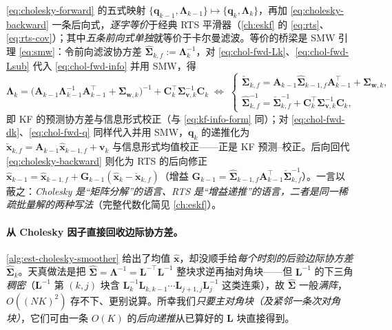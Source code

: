 \begin{insight}[前向 pass $=$ 卡尔曼滤波，前向 $+$ 后向 $=$ RTS 平滑]
\cref{eq:cholesky-forward} 的五式映射 $\{\mathbf{q}_{k-1},\boldsymbol{\Lambda}_{k-1}\}\mapsto\{\mathbf{q}_k,\boldsymbol{\Lambda}_k\}$，再加 \cref{eq:cholesky-backward} 一条后向式，\emph{逐字等价}于经典 RTS 平滑器（\cref{ch:eskf} 的 \cref{eq:rts}、\cref{eq:rts-cov}）；其中\emph{五条前向式单独}就等价于卡尔曼滤波。等价的桥梁是 SMW 引理 \cref{eq:smw}：令前向滤波协方差 $\hat{\boldsymbol{\Sigma}}_{k,f}:=\boldsymbol{\Lambda}_k^{-1}$，对 \cref{eq:chol-fwd-Lk}、\cref{eq:chol-fwd-Lsub} 代入 \cref{eq:chol-fwd-info} 并用 SMW，得
\[
  \boldsymbol{\Lambda}_k=\big(\mathbf{A}_{k-1}\boldsymbol{\Lambda}_{k-1}^{-1}\mathbf{A}_{k-1}^\top+\boldsymbol{\Sigma}_{\mathbf{w},k}\big)^{-1}+\mathbf{C}_k^\top\boldsymbol{\Sigma}_{\mathbf{v},k}^{-1}\mathbf{C}_k
  \;\Longleftrightarrow\;
  \begin{cases}\check{\boldsymbol{\Sigma}}_{k,f}=\mathbf{A}_{k-1}\hat{\boldsymbol{\Sigma}}_{k-1,f}\mathbf{A}_{k-1}^\top+\boldsymbol{\Sigma}_{\mathbf{w},k},\\ \hat{\boldsymbol{\Sigma}}_{k,f}^{-1}=\check{\boldsymbol{\Sigma}}_{k,f}^{-1}+\mathbf{C}_k^\top\boldsymbol{\Sigma}_{\mathbf{v},k}^{-1}\mathbf{C}_k,\end{cases}
\]
即 KF 的预测协方差与信息形式校正（与 \cref{eq:kf-info-form} 同）；对 \cref{eq:chol-fwd-dk}、\cref{eq:chol-fwd-q} 同样代入并用 SMW，$\mathbf{q}_k$ 的递推化为 $\check{\mathbf{x}}_{k,f}=\mathbf{A}_{k-1}\hat{\mathbf{x}}_{k-1,f}+\mathbf{v}_k$ 与信息形式均值校正——正是 KF 预测–校正。后向回代 \cref{eq:cholesky-backward} 则化为 RTS 的后向修正 $\hat{\mathbf{x}}_{k-1}=\hat{\mathbf{x}}_{k-1,f}+\mathbf{G}_{k-1}(\hat{\mathbf{x}}_k-\check{\mathbf{x}}_{k,f})$（增益 $\mathbf{G}_{k-1}=\hat{\boldsymbol{\Sigma}}_{k-1,f}\mathbf{A}_{k-1}^\top\check{\boldsymbol{\Sigma}}_{k,f}^{-1}$）。一言以蔽之：\emph{Cholesky 是“矩阵分解”的语言、RTS 是“增益递推”的语言，二者是同一稀疏批量解的两种写法}（完整代数化简见 \cref{ch:eskf}）。
\end{insight}

\paragraph{从 Cholesky 因子直接回收边际协方差。}
\cref{alg:est-cholesky-smoother} 给出了均值 $\hat{\mathbf{x}}$，却没顺手给\emph{每个时刻的后验边际协方差} $\hat{\boldsymbol{\Sigma}}_k$。天真做法是把 $\hat{\boldsymbol{\Sigma}}=\boldsymbol{\Lambda}^{-1}=\mathbf{L}^{-\top}\mathbf{L}^{-1}$ 整块求逆再抽对角块——但 $\mathbf{L}^{-1}$ 的下三角\emph{稠密}（$\mathbf{L}^{-1}$ 第 $(k,j)$ 块含 $\mathbf{L}_k^{-1}\mathbf{L}_{k,k-1}\cdots\mathbf{L}_{j+1,j}\mathbf{L}_j^{-1}$ 这类连乘），故 $\hat{\boldsymbol{\Sigma}}$ 一般\emph{满阵}，$O((NK)^2)$ 存不下、更别说算。所幸我们\emph{只要主对角块（及紧邻一条次对角块）}，它们可由一条 $O(K)$ 的\emph{后向递推}从已算好的 $\mathbf{L}$ 块直接得到\cite{barfoot2024state}。

